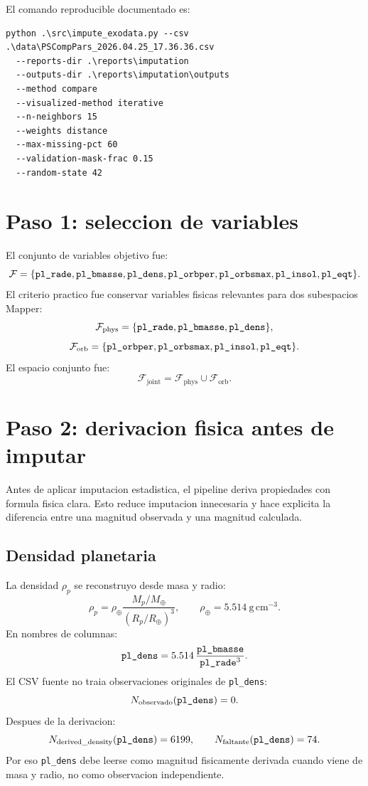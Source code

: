 \documentclass[11pt,letterpaper]{article}
\newcommand{\code}[1]{\ifmmode\text{\texttt{#1}}\else\texttt{#1}\fi}
\begin{document}
El comando reproducible documentado es:
\begin{verbatim}
python .\src\impute_exodata.py --csv .\data\PSCompPars_2026.04.25_17.36.36.csv
  --reports-dir .\reports\imputation
  --outputs-dir .\reports\imputation\outputs
  --method compare
  --visualized-method iterative
  --n-neighbors 15
  --weights distance
  --max-missing-pct 60
  --validation-mask-frac 0.15
  --random-state 42
\end{verbatim}

\section{Paso 1: seleccion de variables}

El conjunto de variables objetivo fue:
\[
\mathcal{F} =
\{
  \code{pl\_rade},
  \code{pl\_bmasse},
  \code{pl\_dens},
  \code{pl\_orbper},
  \code{pl\_orbsmax},
  \code{pl\_insol},
  \code{pl\_eqt}
\}.
\]
El criterio practico fue conservar variables fisicas relevantes para dos
subespacios Mapper:
\[
  \mathcal{F}_{\mathrm{phys}}
  =
  \{
    \code{pl\_rade},\code{pl\_bmasse},\code{pl\_dens}
  \},
\]
\[
  \mathcal{F}_{\mathrm{orb}}
  =
  \{
    \code{pl\_orbper},\code{pl\_orbsmax},\code{pl\_insol},\code{pl\_eqt}
  \}.
\]
El espacio conjunto fue:
\[
  \mathcal{F}_{\mathrm{joint}}
  =
  \mathcal{F}_{\mathrm{phys}}\cup\mathcal{F}_{\mathrm{orb}}.
\]

\section{Paso 2: derivacion fisica antes de imputar}

Antes de aplicar imputacion estadistica, el pipeline deriva propiedades con
formula fisica clara. Esto reduce imputacion innecesaria y hace explicita la
diferencia entre una magnitud observada y una magnitud calculada.

\subsection{Densidad planetaria}

La densidad \(\rho_p\) se reconstruyo desde masa y radio:
\[
  \rho_p
  =
  \rho_\oplus
  \frac{M_p/M_\oplus}{(R_p/R_\oplus)^3},
  \qquad
  \rho_\oplus = 5.514\ \mathrm{g\,cm}^{-3}.
\]
En nombres de columnas:
\[
  \code{pl\_dens}
  =
  5.514\,
  \frac{\code{pl\_bmasse}}{\code{pl\_rade}^{3}}.
\]
El CSV fuente no traia observaciones originales de \code{pl\_dens}:
\[
  N_{\mathrm{observado}}(\code{pl\_dens}) = 0.
\]
Despues de la derivacion:
\[
  N_{\mathrm{derived\_density}}(\code{pl\_dens}) = 6199,\qquad
  N_{\mathrm{faltante}}(\code{pl\_dens}) = 74.
\]
Por eso \code{pl\_dens} debe leerse como magnitud fisicamente derivada cuando
viene de masa y radio, no como observacion independiente.
\end{document}
